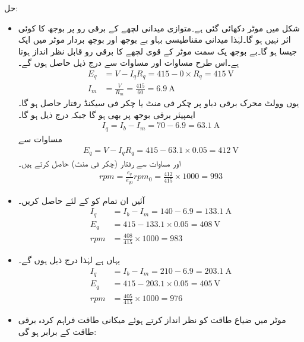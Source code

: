 حل:
\begin{itemize}
\item
شکل  میں موٹر دکھائی گئی ہے۔متوازی میدانی لچھے کے برقی رو پر بوجھ کا کوئی اثر نہیں ہو گا۔لہٰذا میدانی مقناطیسی بہاو بے بوجھ اور بوجھ بردار موٹر میں ایک جیسا ہو گا۔بے بوجھ یک سمت  موٹر کے قوی لچھے کا برقی رو   قابل نظر انداز ہوتا ہے۔اس طرح مساوات   اور مساوات   سے  درج ذیل حاصل ہوں گے۔
\begin{align*}
E_q&=V-I_q R_q=415-0\times R_q=\SI{415}{\volt}\\
I_m&=\frac{V}{R_m}=\frac{415}{60}= \SI{6.9}{\ampere}
\end{align*}
یوں  وولٹ محرک برقی دباو پر   چکر فی منٹ یا  چکر فی سیکنڈ رفتار حاصل ہو گا۔ ایمپیئر برقی بوجھ پر بھی  ہو گا جبکہ   درج ذیل ہو گا۔
\begin{align*}
I_q=I_b-I_m=70-6.9= \SI{63.1}{\ampere}
\end{align*}
 مساوات   سے 
\begin{align*}
E_q=V-I_q R_q=415-63.1 \times 0.05=\SI{412}{\volt}
\end{align*}
اور مساوات   سے رفتار (چکر فی منٹ) حاصل کرتے ہیں۔
\begin{align*}
rpm=\frac{e_q}{e_{q0}} rpm_0=\frac{412}{415} \times 1000=993
\end{align*}
%
\item
آئیں ان تمام کو   کے لئے حاصل کریں۔
\begin{align*}
I_q&=I_b-I_m=140-6.9=\SI{133.1}{\ampere}\\
E_q&=415-133.1 \times 0.05=\SI{408}{\volt}\\
rpm&=\frac{408}{415} \times 1000=983
\end{align*}
%
\item
یہاں  ہے لہٰذا درج ذیل ہوں گے۔
\begin{align*}
I_q&=I_b-I_m=210-6.9=\SI{203.1}{\ampere}\\
E_q&=415-203.1 \times 0.05=\SI{405}{\volt}\\
rpm&=\frac{405}{415} \times 1000=976
\end{align*}
%
\item
موٹر میں ضیاع طاقت  کو نظر انداز کرتے ہوئے میکانی طاقت فراہم کردہ برقی طاقت کے برابر ہو گی:
\begin{align}

\end{align}
\end{itemize}
